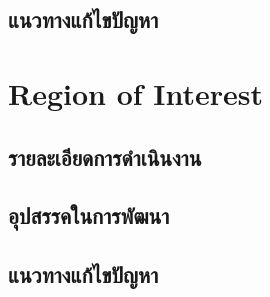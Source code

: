\documentclass{report}
\begin{document}
\subsection{แนวทางแก้ไขปัญหา}

\section{Region of Interest}
\subsection{รายละเอียดการดำเนินงาน}

\subsection{อุปสรรคในการพัฒนา}

\subsection{แนวทางแก้ไขปัญหา}
\end{document}
